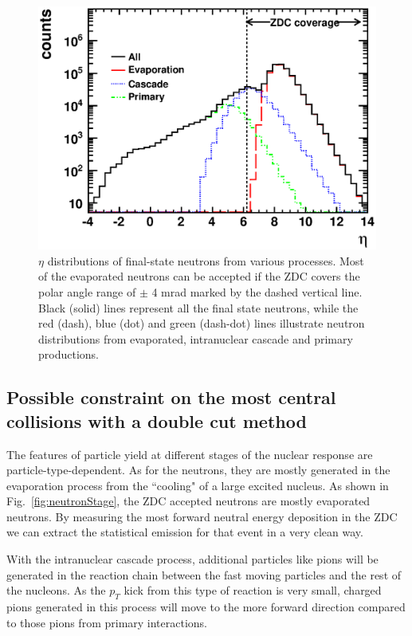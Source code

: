 \begin{figure}
\begin{center}
\includegraphics[width=1.0\columnwidth]{plots/chpt7/neutron_ZDC_cuts.eps}
\caption[$\eta$ distribution for all final-state neutrons in an \eA\ collision]{$\eta$ distributions of final-state neutrons from various processes. Most of the evaporated neutrons can be accepted
if the ZDC covers the polar angle range of $\pm$ 4 mrad marked by the
dashed vertical line. Black (solid) lines represent all the final state
neutrons, while the red (dash), blue (dot) and green (dash-dot) lines illustrate neutron distributions
from evaporated, intranuclear cascade and primary productions.}
\label{fig:neutronZDC}
\end{center}
\end{figure}



\subsection{Possible constraint on the most central collisions with a double cut method}

The features of particle yield at different stages of the nuclear response
are particle-type-dependent. As for the neutrons, they are mostly generated
in the evaporation process from the ``cooling" of a large excited nucleus.
As shown in Fig.~\ref{fig:neutronStage}, the ZDC accepted
neutrons are mostly evaporated neutrons. By measuring the most forward
neutral energy deposition in the ZDC we can extract the statistical emission
for that event in a very clean way.

With the intranuclear cascade process, additional particles like pions
will be generated in the reaction chain between the fast moving particles
and the rest of the nucleons.
As the $p_{T}$ kick from this type of reaction is very small, charged pions
generated in this process will move to the more forward direction compared
to those pions from primary interactions.


